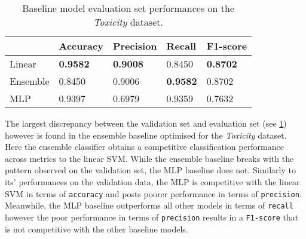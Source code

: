 \begin{table}[h]
  \centering
  \begin{tabular}{l|llll}
                          & Accuracy        & Precision       & Recall          & F1-score        \\\hline
    Linear                & \textbf{0.9582} & \textbf{0.9008} & 0.8450          & \textbf{0.8702} \\
    Ensemble\footnotemark & 0.8450          & 0.9006          & \textbf{0.9582} & 0.8702          \\
    MLP                   & 0.9397          & 0.6979          & 0.9359          & 0.7632
  \end{tabular}
  \caption{Baseline model evaluation set performances on the \textit{Toxicity} dataset.}
  \label{tab:baseline_test_wulczyn}
\end{table}

The largest discrepancy between the validation set and evaluation set (see \cref{tab:baseline_test_wulczyn}) however is found in the ensemble baseline optimised for the \textit{Toxicity} dataset.
Here the ensemble classifier obtains a competitive classification performance across metrics to the linear SVM.
While the ensemble baseline breaks with the pattern observed on the validation set, the MLP baseline does not.
Similarly to its' performances on the validation data, the MLP is competitive with the linear SVM in terms of \texttt{accuracy} and posts poorer performance in terms of \texttt{precision}.
Meanwhile, the MLP baseline outperforms all other models in terms of \texttt{recall} however the poor performance in terms of \texttt{precision} results in a \texttt{F1-score} that is not competitive with the other baseline models.

